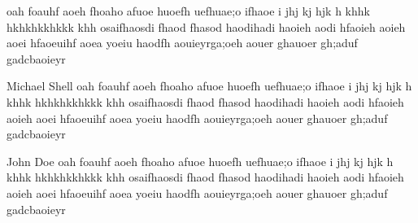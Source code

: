 \documentclass[journal]{IEEEtran}
\begin{document}
%
%
%
\begin{thebibliography}{1}

oah foauhf aoeh fhoaho  afuoe huoefh uefhuae;o ifhaoe i jhj kj hjk h khhk hkhkhkkhkkk khh  osaifhaosdi fhaod fhasod haodihadi haoieh aodi hfaoieh aoieh aoei hfaoeuihf aoea yoeiu haodfh aouieyrga;oeh aouer ghauoer gh;aduf gadcbaoieyr

\end{thebibliography}

% 

\begin{IEEEbiography}{Michael Shell}
oah foauhf aoeh fhoaho  afuoe huoefh uefhuae;o ifhaoe i jhj kj hjk h khhk hkhkhkkhkkk khh  osaifhaosdi fhaod fhasod haodihadi haoieh aodi hfaoieh aoieh aoei hfaoeuihf aoea yoeiu haodfh aouieyrga;oeh aouer ghauoer gh;aduf gadcbaoieyr
\end{IEEEbiography}

\begin{IEEEbiographynophoto}{John Doe}
oah foauhf aoeh fhoaho  afuoe huoefh uefhuae;o ifhaoe i jhj kj hjk h khhk hkhkhkkhkkk khh  osaifhaosdi fhaod fhasod haodihadi haoieh aodi hfaoieh aoieh aoei hfaoeuihf aoea yoeiu haodfh aouieyrga;oeh aouer ghauoer gh;aduf gadcbaoieyr
\end{IEEEbiographynophoto}
\end{document}
